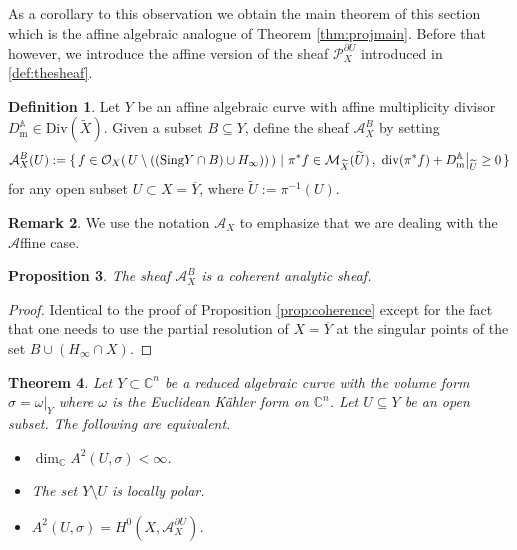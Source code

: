 \documentclass[11pt]{amsart}
\newtheorem{theorem}{Theorem}[section]
\newtheorem{prop}[theorem]{Proposition}
\theoremstyle{definition}
\newtheorem{definition}[theorem]{Definition}
\newtheorem{remark}[theorem]{Remark}
\newcommand{\bC}{{\mathbb C}}
\begin{document}
    \noindent As a corollary to this observation we obtain the main theorem of this section which is the affine algebraic analogue of Theorem \ref{thm:projmain}. Before that however, we introduce the affine version of the sheaf $\mathcal{P}_X^{\partial U}$ introduced in \ref{def:thesheaf}.

    \begin{definition}\label{def:theaffsheaf}
    Let $Y$ be an affine algebraic curve with affine multiplicity divisor $D_\text{m}^\mathbb{A} \in \text{Div}(\widetilde{X})$. Given a subset $B \subseteq Y$, define the sheaf $\mathcal{A}_X^B$ by setting
     $$\mathcal{A}_X^B(U) := \{ \, f\in \mathcal{O}_X(\,U \setminus ((\text{Sing}Y \cap B)\cup H_\infty))\,) \ | \ \pi^*f \in \mathcal{M}_{\widetilde X}(\widetilde{U}) \, , \ \text{\normalfont div}(\pi^*f) +D_\text{\normalfont m}^\mathbb{A}\big|_{\widetilde{U}} \geq 0 \, \}$$
     for any open subset $U \subset X = \overline{Y}$, where $\widetilde{U}:=\pi^{-1}(U)$.
\end{definition}
\begin{remark}
    We use the notation $\mathcal{A}_X$ to emphasize that we are dealing with the $\mathcal{A}$ffine case.
\end{remark}
\begin{prop}
    The sheaf $\mathcal{A}_X^B$ is a coherent analytic sheaf.
\end{prop}

\begin{proof}
    Identical to the proof of Proposition \ref{prop:coherence} except for the fact that one needs to use the partial resolution of $X = \overline{Y}$ at the singular points of the set $B \cup (H_\infty\cap X)$.
\end{proof}


   \begin{theorem}\label{thm:affmain}
    Let $Y \subset \bC^n$ be a reduced algebraic curve with the volume form $\sigma = \omega\big|_Y$ where $\omega$ is the Euclidean K\"ahler form on $\bC^n$. Let $U \subseteq Y$ be an open subset. The following are equivalent.
    \begin{itemize}
        \item[(a)] $\dim_\bC A^2(U,\sigma) < \infty$.
        \item[(b)] The set $Y\setminus U$ is locally polar.
        \item[(c)] $A^2(U,\sigma) = H^0(X,\mathcal{A}_X^{\partial U})$.
    \end{itemize}
\end{theorem}
\end{document}
